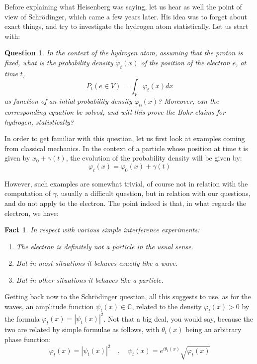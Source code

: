 \documentclass[12pt]{amsbook}
\newtheorem{fact}[theorem]{Fact}
\newtheorem{question}[theorem]{Question}
\begin{document}
\bigskip

Before explaining what Heisenberg was saying, let us hear as well the point of view of Schr\"odinger, which came a few years later. His idea was to forget about exact things, and try to investigate the hydrogen atom statistically. Let us start with:

\begin{question}
In the context of the hydrogen atom, assuming that the proton is fixed, what is the probability density $\varphi_t(x)$ of the position of the electron $e$, at time $t$,
$$P_t(e\in V)=\int_V\varphi_t(x)dx$$
as function of an intial probability density $\varphi_0(x)$? Moreover, can the corresponding equation be solved, and will this prove the Bohr claims for hydrogen, statistically?
\end{question}

In order to get familiar with this question, let us first look at examples coming from classical mechanics. In the context of a particle whose position at time $t$ is given by $x_0+\gamma(t)$, the evolution of the probability density will be given by: 
$$\varphi_t(x)=\varphi_0(x)+\gamma(t)$$

However, such examples are somewhat trivial, of course not in relation with the computation of $\gamma$, usually a difficult question, but in relation with our questions, and do not apply to the electron. The point indeed is that, in what regards the electron, we have:

\begin{fact}
In respect with various simple interference experiments:
\begin{enumerate}
\item The electron is definitely not a particle in the usual sense.

\item But in most situations it behaves exactly like a wave.

\item But in other situations it behaves like a particle.
\end{enumerate}
\end{fact}

Getting back now to the Schr\"odinger question, all this suggests to use, as for the waves, an amplitude function $\psi_t(x)\in\mathbb C$, related to the density $\varphi_t(x)>0$ by the formula $\varphi_t(x)=|\psi_t(x)|^2$. Not that a big deal, you would say, because the two are related by simple formulae as follows, with $\theta_t(x)$ being an arbitrary phase function:
$$\varphi_t(x)=|\psi_t(x)|^2\quad,\quad \psi_t(x)=e^{i\theta_t(x)}\sqrt{\varphi_t(x)}$$
\end{document}
